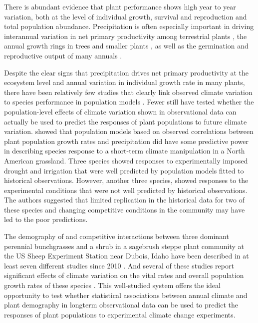 \documentclass[11pt]{article}
\begin{document}
\begin{doublespacing}
There is abundant evidence that plant performance shows high year to year variation, both at the level of individual growth, survival and reproduction and total population abundance. Precipitation is often especially important in driving interannual variation in net primary productivity among terrestrial plants \citep{knapp_variation_2001,hsu_anticipating_2014}, the annual growth rings in trees \citep{yang_3500-year_2014} and smaller plants \citep{srur_annual_2009,franklin_growth_2013}, as well as the germination and reproductive output of many annuals \citep{venable_bet_2007}. 

Despite the clear signs that precipitation drives net primary productivity at the ecosystem level and annual variation in individual growth rate in many plants, there have been relatively few studies that clearly link observed climate variation to species performance in population models \citep{ehrlen_advancing_2016}. Fewer still have tested whether the population-level effects of climate variation shown in observational data can actually be used to predict the responses of plant populations to future climate variation. \citep{adler_can_2013} showed that population models based on observed correlations between plant population growth rates and precipitation did have some predictive power in describing species response to a short-term climate manipulation in a North American grassland. Three species showed responses to experimentally imposed drought and irrigation that were well predicted by population models fitted to historical observations.  However, another three species, showed responses to the experimental conditions that were not well predicted by historical observations. The authors suggested that limited replication in the historical data for two of these species and changing competitive conditions in the community may have led to the poor predictions.  

The demography of and competitive interactions between three dominant perennial bunchgrasses and a shrub in a sagebrush steppe plant community at the US Sheep Experiment Station near Dubois, Idaho have been described in at least seven different studies since 2010 \citep{adler_coexistence_2010,adler_forecasting_2012,adler_weak_2009,adler_weak_2016,chu_direct_2016,chu_large_2015,dalgleish_climate_2010}. And several of these studies report significant effects of climate variation on the vital rates and overall population growth rates of these species \citep{dalgleish_climate_2010,adler_forecasting_2012,adler_weak_2009,chu_direct_2016}. This well-studied system offers the ideal opportunity to test whether statistical associations between annual climate and plant demography in longterm observational data can be used to predict the responses of plant populations to experimental climate change experiments.  


\end{doublespacing}
\end{document}
